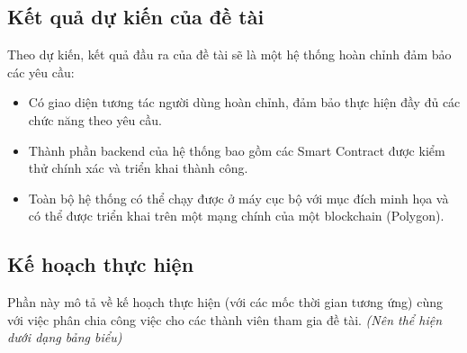 \documentclass{article}[14pt]
\begin{document}
{    \subsection{Kết quả dự kiến của đề tài}
        Theo dự kiến, kết quả đầu ra của đề tài sẽ là một hệ thống hoàn chỉnh đảm bảo các yêu cầu: 
        \begin{itemize}
            \item Có giao diện tương tác người dùng hoàn chỉnh, đảm bảo thực hiện đầy đủ các chức năng theo yêu cầu. 
            \item Thành phần backend của hệ thống bao gồm các Smart Contract được kiểm thử chính xác và triển khai thành công. 
            \item Toàn bộ hệ thống có thể chạy được ở máy cục bộ với mục đích minh họa và có thể được triển khai trên một mạng chính của một blockchain (Polygon). 
        \end{itemize}
    
    \subsection{Kế hoạch thực hiện}
        
        Phần này mô tả về kế hoạch thực hiện (với các mốc thời gian tương ứng) cùng với việc phân chia công việc cho các thành viên tham gia đề tài. \textit{(Nên thể hiện dưới dạng bảng biểu)}

}
\end{document}
